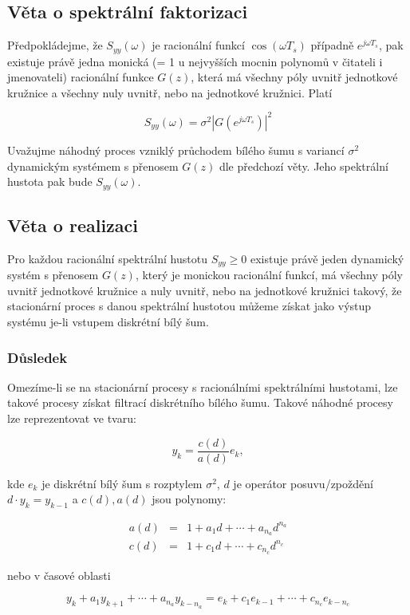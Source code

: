 \subsection{Věta o spektrální faktorizaci}

Předpokládejme, že $S_{yy}(\omega)$ je racionální funkcí $\cos(\omega T_s)$ případně $e^{j\omega T_s}$, pak existuje právě jedna monická (= 1 u nejvyšších mocnin polynomů v čitateli i jmenovateli) racionální funkce $G(z)$, která má všechny póly uvnitř jednotkové kružnice a všechny nuly uvnitř, nebo na jednotkové kružnici. Platí

\[ S_{yy}(\omega) = \sigma^2\left|G\left(e^{j\omega T_s}\right)\right|^2 \]

Uvažujme náhodný proces vzniklý průchodem bílého šumu s variancí $\sigma^2$ dynamickým systémem s přenosem $G(z)$ dle předchozí věty. Jeho spektrální hustota pak bude $S_{yy}(\omega)$.

\subsection{Věta o realizaci}
Pro každou racionální spektrální hustotu $S_{yy}\geq 0$ existuje právě jeden dynamický systém s přenosem $G(z)$, který je monickou racionální funkcí, má všechny póly uvnitř jednotkové kružnice a nuly uvnitř, nebo na jednotkové kružnici takový, že stacionární proces s danou spektrální hustotou můžeme získat jako výstup systému je-li vstupem diskrétní bílý šum.

\subsubsection{Důsledek}
Omezíme-li se na stacionární procesy s racionálními spektrálními hustotami, lze takové procesy získat filtrací diskrétního bílého šumu. Takové náhodné procesy lze reprezentovat ve tvaru:

\[ y_k = \frac{c(d)}{a(d)}e_k, \]

kde $e_k$ je diskrétní bílý šum s rozptylem $\sigma^2$, $d$ je operátor posuvu/zpoždění $d\cdot y_k=y_{k-1}$ a $c(d),a(d)$ jsou polynomy:

\begin{eqnarray*}
a(d) & = & 1 + a_1d + \cdots + a_{n_a}d^{n_a}\\
c(d) & = & 1 + c_1d + \cdots + c_{n_c}d^{n_c}
\end{eqnarray*}

nebo v časové oblasti

\[ y_k + a_1y_{k+1}+\cdots+a_{n_a}y_{k-n_a}=e_k+c_1e_{k-1}+\cdots+c_{n_c}e_{k-n_c} \]

